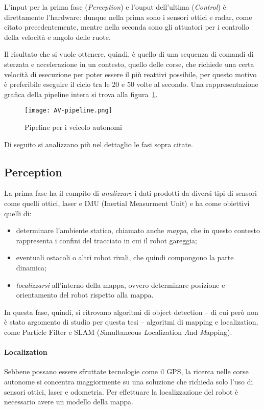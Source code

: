 L'input per la prima fase (\textit{Perception}) e l'ouput dell'ultima (\textit{Control})
è direttamente l'hardware: dunque nella prima sono i sensori ottici e radar, come citato precedentemente,
mentre nella seconda sono gli attuatori per i controllo della velocità e angolo delle ruote.

Il risultato che si vuole ottenere, quindi, è quello di una sequenza di comandi di sterzata e
accelerazione in un contesto, quello delle corse, che richiede una certa velocità di esecuzione per poter
essere il più reattivi possibile, per questo motivo è preferibile eseguire il ciclo tra le 20 e 50 volte
al secondo. Una rappresentazione grafica della pipeline intera si trova alla figura~\ref{fig:av-pipeline}.

\begin{figure}[H]
\centering
\caption{Pipeline per i veicolo autonomi \cite{overview}}
\texttt{[image: AV-pipeline.png]}
\label{fig:av-pipeline}
\end{figure}

Di seguito si analizzano più nel dettaglio le fasi sopra citate.
\subsection{Perception} 
La prima fase ha il compito di \textit{analizzare} i dati prodotti da diversi tipi di sensori come quelli
ottici, laser e IMU (Inertial Measurment Unit) e ha come obiettivi quelli di: \cite{betz2022autonomous}
\begin{itemize}
	\item determinare l'ambiente statico, chiamato anche \textit{mappa}, che in questo contesto
	      rappresenta i confini del tracciato in cui il robot gareggia;
	\item eventuali ostacoli o altri robot rivali, che quindi compongono la
	      parte dinamica; 
	\item \textit{localizzarsi} all'interno della mappa, ovvero
	      determinare posizione e orientamento del robot rispetto alla mappa.
\end{itemize}
In questa fase, quindi, si ritrovano algoritmi di object detection -- di cui però non è stato argomento
di studio per questa tesi -- algoritmi di mapping e localization, come Particle Filter e SLAM
(\textit{S}imultaneous \textit{L}ocalization \textit{A}nd \textit{M}apping).

\paragraph{Localization}
Sebbene possano essere sfruttate tecnologie come il GPS, la ricerca nelle corse autonome si concentra
maggiormente su una soluzione che richieda solo l'uso di sensori ottici, laser e odometria.
\cite{betz2022autonomous} Per effettuare la localizzazione del robot è necessario avere un modello della
mappa.

